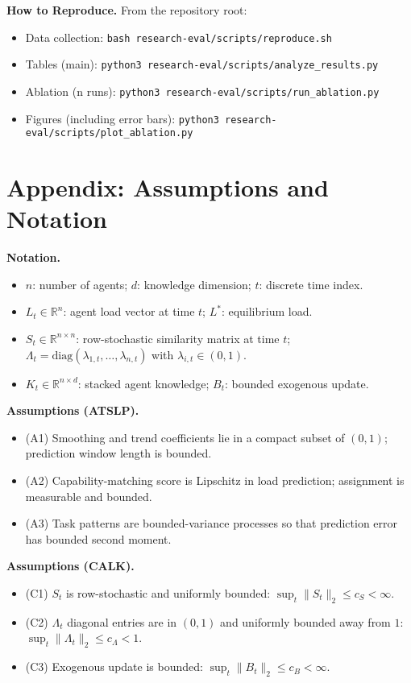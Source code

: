 \documentclass[conference]{IEEEtran}
\begin{document}
\noindent\textbf{How to Reproduce.} From the repository root:
\begin{itemize}
\item Data collection: \texttt{bash research-eval/scripts/reproduce.sh}
\item Tables (main): \texttt{python3 research-eval/scripts/analyze\_results.py}
\item Ablation (n runs): \texttt{python3 research-eval/scripts/run\_ablation.py}
\item Figures (including error bars): \texttt{python3 research-eval/scripts/plot\_ablation.py}
\end{itemize}

\section{Appendix: Assumptions and Notation}

\noindent\textbf{Notation.}
\begin{itemize}
\item $n$: number of agents; $d$: knowledge dimension; $t$: discrete time index.
\item $L_t \in \mathbb{R}^n$: agent load vector at time $t$; $L^*$: equilibrium load.
\item $S_t \in \mathbb{R}^{n\times n}$: row-stochastic similarity matrix at time $t$; $\Lambda_t=\mathrm{diag}(\lambda_{1,t},\dots,\lambda_{n,t})$ with $\lambda_{i,t}\in(0,1)$.
\item $K_t \in \mathbb{R}^{n\times d}$: stacked agent knowledge; $B_t$: bounded exogenous update.
\end{itemize}

\noindent\textbf{Assumptions (ATSLP).}
\begin{itemize}
\item (A1) Smoothing and trend coefficients lie in a compact subset of $(0,1)$; prediction window length is bounded.
\item (A2) Capability-matching score is Lipschitz in load prediction; assignment is measurable and bounded.
\item (A3) Task patterns are bounded-variance processes so that prediction error has bounded second moment.
\end{itemize}

\noindent\textbf{Assumptions (CALK).}
\begin{itemize}
\item (C1) $S_t$ is row-stochastic and uniformly bounded: $\sup_t\|S_t\|_2\le c_S<\infty$.
\item (C2) $\Lambda_t$ diagonal entries are in $(0,1)$ and uniformly bounded away from $1$: $\sup_t\|\Lambda_t\|_2\le c_\Lambda<1$.
\item (C3) Exogenous update is bounded: $\sup_t\|B_t\|_2\le c_B<\infty$.
\end{itemize}
\end{document}
